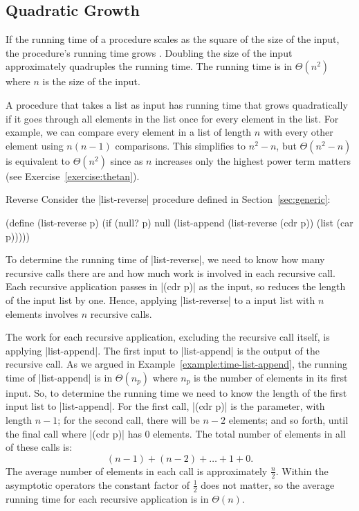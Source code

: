 \begin{schemeregion}

\subsection{Quadratic Growth}

If the running time of a procedure scales as the square of the size of the input, the procedure's running time grows .  
Doubling the size of the input approximately quadruples the running time.  The running time is in $\Theta(n^2)$ where $n$ is the size of the input.  

A procedure that takes a list as input has running time that grows quadratically if it goes through all elements in the list once for every element in the list.  For example, we can compare every element in a list of length $n$ with every other element using $n(n-1)$ comparisons.  This simplifies to $n^2 - n$, but $\Theta(n^2 - n)$ is equivalent to $\Theta(n^2)$ since as $n$ increases only the highest power term matters (see Exercise~\ref{exercise:thetan}).  

\begin{examplenobar}{Reverse}\label{example:list-reverse-time}
Consider the \scheme|list-reverse| procedure defined in Section~\ref{sec:generic}:
\begin{schemedisplay}
(define (list-reverse p)
  (if (null? p) null (list-append (list-reverse (cdr p)) (list (car p)))))
\end{schemedisplay}

To determine the running time of \scheme|list-reverse|, we need to know how many recursive calls there are and how much work is involved in each recursive call.  Each recursive application passes in \scheme|(cdr p)| as the input, so reduces the length of the input list by one.  Hence,  applying \scheme|list-reverse| to a input list with $n$ elements involves $n$ recursive calls.  

The work for each recursive application, excluding the recursive call itself, is applying \scheme|list-append|.  The first input to \scheme|list-append| is the output of the recursive call.  As we argued in Example~\ref{example:time-list-append}, the running time of \scheme|list-append| is in $\Theta(n_p)$ where $n_p$ is the number of elements in its first input.  So, to determine the running time we need to know the length of the first input list to \scheme|list-append|.  For the first call, \scheme|(cdr p)| is the parameter, with length $n-1$; for the second call, there will be $n-2$ elements; and so forth, until the final call where \scheme|(cdr p)| has $0$ elements.  The total number of elements in all of these calls is: 
\begin{displaymath}
(n-1) + (n-2) + \ldots + 1 + 0.  
\end{displaymath}
The average number of elements in each call is approximately $\frac{n}{2}$.  Within the asymptotic operators the constant factor of $\frac{1}{2}$ does not matter, so the average running time for each recursive application is in $\Theta(n)$.  


\end{examplenobar}
\end{schemeregion}
